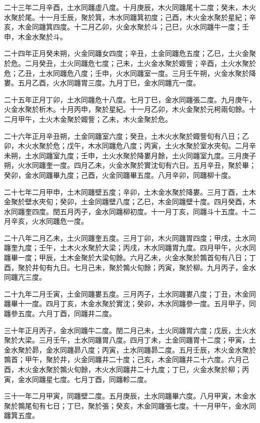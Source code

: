 \begin{pinyinscope}
二十三年二月辛酉，土水同躔虛八度。十月庚辰，木火同躔尾十二度；癸未，木火水聚於尾。十一月壬辰，聚於箕，木水同躔箕初度；己酉，木火金水聚於星紀；辛亥，木金同躔箕四度。十二月乙卯，火金水聚於斗；己巳，火水同躔牛一度；壬申，木金水聚於斗。

二十四年正月癸未朔，火金同躔女四度；辛丑，土金同躔危五度；乙巳，土火金聚於危。二月癸丑，土火同躔危七度；己未，土火金水聚於娵訾；辛酉，土火水聚於危；乙丑，土水同躔危八度；壬申，火水同躔室一度。三月壬午朔，火金水聚於降婁。五月乙酉，火水同躔胃三度。九月丁巳，金水同躔亢一度。

二十五年正月丁卯，土水同躔危十八度。七月丁巳，金水同躔張二度。九月庚午，火金水聚於析木。十月丙申，聚於星紀。十一月乙卯，木火金聚於元枵兩旬餘。十二月甲午，土火木金聚於娵訾；乙未，木火金聚於危。

二十六年正月辛丑朔，土金同躔室六度；癸丑，土木火水聚於娵訾旬有八日；乙卯，木火水聚於危；戊午，木水同躔危八度；丙寅，土火水聚於室水夾旬。二月辛未朔，土水同躔室九度；壬申，土火水聚於降婁月餘，土火同躔室九度。三月庚子朔，火水同躔奎一度。四月乙未，火金水聚於實沈旬有六日。五月辛丑，聚於畢；癸卯，金水同躔畢九度；己酉，火金同躔畢五度。八月辛卯，同躔柳十度。

二十七年二月甲申，土木同躔壁五度；辛卯，土木金水聚於降婁。三月丁酉，土木金聚於壁水夾旬；癸卯，土金同躔壁八度；乙巳，木金同躔壁十度。四月癸酉，木水同躔奎四度。閏五月丙子，金水同躔柳初度。十一月丁亥，同躔斗十五度。十二月辛亥，火水同躔危一度。

二十八年二月乙未，土火同躔奎五度。三月丁卯，木火同躔胃四度；甲戌，土水同躔奎九度；壬午，土木火水聚於大梁；丙戌，木水同躔胃九度。四月甲午，火水同躔畢一度；甲辰，土木金聚於大梁旬餘。六月乙未，火金水聚於鶉首旬有八日；丁酉，聚於井旬有九日。七月己未，聚於鶉火旬餘；丙寅，聚於柳。九月丙子，金水同躔亢三度。

二十九年二月壬寅，土金同躔婁五度。三月丙子，土水同躔婁八度；丁丑，木金同躔畢十一度。四月丁亥，木金水聚於實沈；癸卯，木水同躔參一度。五月甲子，同躔參五度。六月丁酉，同躔井二度。

三十年正月丙子，金水同躔牛二度。閏二月己未，土火同躔胃六度；戊辰，土火水聚於大梁。三月壬午，土水同躔胃八度。四月丁未，土金同躔胃十二度；甲寅，土金水聚於昴，金水同躔昴八度；丙寅，土水同躔昴二度。五月壬辰，木火金水聚於鶉首；甲午，聚於井，火金同躔井二十度；己亥，木金同躔井二十六度。六月己酉，木火金水聚於鶉火旬餘，木火水同躔井二十九度；丁巳，火金水聚於柳；丙寅，金水同躔星七度。七月丁酉，同躔軫二度。

三十一年二月甲寅，同躔壁二度。五月庚辰，土水同躔畢六度。八月甲寅，木金水聚於鶉尾旬有七日；丁巳，聚於張；癸亥，木金同躔張七度。十一月甲午，金水同躔箕五度。


\end{pinyinscope}
